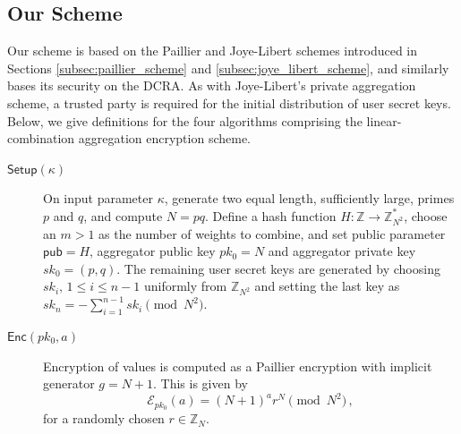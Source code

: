\documentclass[twocolumn]{autart}
\begin{document}
\subsection{Our Scheme} \label{subsec:our_scheme}
Our scheme is based on the Paillier and Joye-Libert schemes introduced in Sections \ref{subsec:paillier_scheme} and \ref{subsec:joye_libert_scheme}, and similarly bases its security on the DCRA. As with Joye-Libert's private aggregation scheme, a trusted party is required for the initial distribution of user secret keys. Below, we give definitions for the four algorithms comprising the linear-combination aggregation encryption scheme.

\begin{description}
    \item[$\mathsf{Setup}(\kappa)$] On input parameter $\kappa$, generate two equal length, sufficiently large, primes $p$ and $q$, and compute $N=pq$. Define a hash function $H:\mathbb{Z} \rightarrow \mathbb{Z}_{N^2}^*$, choose an $m>1$ as the number of weights to combine, and set public parameter $\mathsf{pub}=H$, aggregator public key $pk_0 = N$ and aggregator private key $sk_0=(p,q)$. The remaining user secret keys are generated by choosing $sk_i,\,1\leq i\leq n-1$ uniformly from $\mathbb{Z}_{N^2}$ and setting the last key as $sk_n = -\sum^{n-1}_{i=1}sk_i \pmod{N^2}$.
 
    \item[$\mathsf{Enc}(pk_0, a)$] Encryption of values is computed as a Paillier encryption with implicit generator $g=N+1$. This is given by
    \begin{equation}
        \mathcal{E}_{pk_0}(a) = (N+1)^{a}r^N \pmod{N^2}\,, \label{eqn:our_scheme_encrypt}
    \end{equation}
    for a randomly chosen $r \in \mathbb{Z}_N$.


\end{description}
\end{document}
